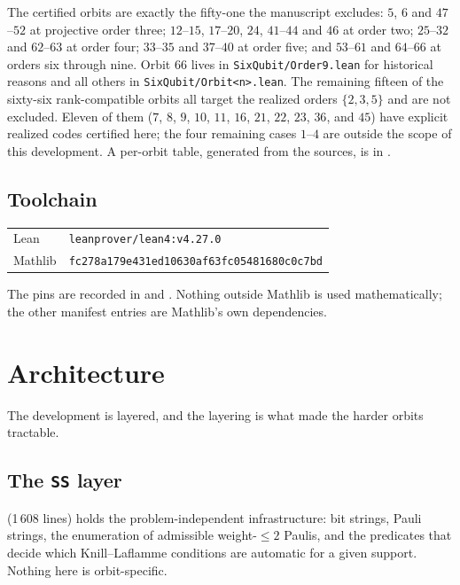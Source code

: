 \documentclass[11pt,a4paper]{article}
\newcommand{\lean}[1]{\texttt{#1}}
\theoremstyle{definition}
\begin{document}
The certified orbits are exactly the fifty-one the manuscript excludes:
$5$, $6$ and $47$--$52$ at projective order three; $12$--$15$, $17$--$20$, $24$,
$41$--$44$ and $46$ at order two; $25$--$32$ and $62$--$63$ at order four;
$33$--$35$ and $37$--$40$ at order five; and $53$--$61$ and $64$--$66$ at orders
six through nine. Orbit $66$ lives in \lean{SixQubit/Order9.lean} for historical
reasons and all others in \lean{SixQubit/Orbit<n>.lean}. The remaining fifteen of
the sixty-six rank-compatible orbits all target the realized orders $\{2,3,5\}$ and
are not excluded. Eleven of them ($7$, $8$, $9$, $10$, $11$, $16$, $21$, $22$,
$23$, $36$, and $45$) have explicit realized codes certified here; the four
remaining cases $1$--$4$ are outside the scope of this development.
A per-orbit table, generated from the sources, is in
.

\subsection{Toolchain}

\begin{center}
\begin{tabular}{ll}
\toprule
Lean & \lean{leanprover/lean4:v4.27.0} \\
Mathlib & \lean{fc278a179e431ed10630af63fc05481680c0c7bd} \\
\bottomrule
\end{tabular}
\end{center}

The pins are recorded in  and .
Nothing outside Mathlib is used mathematically; the other manifest entries are
Mathlib's own dependencies.

\section{Architecture}

The development is layered, and the layering is what made the harder orbits
tractable.

\subsection{The \lean{SS} layer}

 (1\,608 lines) holds the problem-independent infrastructure: bit
strings, Pauli strings, the enumeration of admissible weight-$\le 2$ Paulis, and
the predicates that decide which Knill--Laflamme conditions are automatic for a
given support. Nothing here is orbit-specific.
\end{document}
